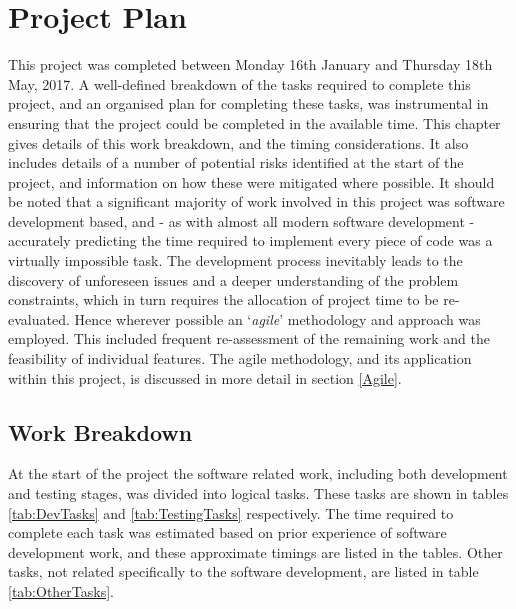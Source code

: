 
\chapter[Project Plan]{Project Plan} %

\label{ChapterPlan} %


This project was completed between Monday 16th January and Thursday 18th May, 2017. A well-defined breakdown of the tasks required to complete this project, and an organised plan for completing these tasks, was instrumental in ensuring that the project could be completed in the available time. This chapter gives details of this work breakdown, and the timing considerations. It also includes details of a number of potential risks identified at the start of the project, and information on how these were mitigated where possible. It should be noted that a significant majority of work involved in this project was software development based, and - as with almost all modern software development - accurately predicting the time required to implement every piece of code was a virtually impossible task. The development process inevitably leads to the discovery of unforeseen issues and a deeper understanding of the problem constraints, which in turn requires the allocation of project time to be re-evaluated. Hence wherever possible an `\textit{agile}' methodology and approach was employed. This included frequent re-assessment of the remaining work and the feasibility of individual features. The agile methodology, and its application within this project, is discussed in more detail in section \ref{Agile}.


\section{Work Breakdown}
At the start of the project the software related work, including both development and testing stages, was divided into logical tasks. These tasks are shown in tables \ref{tab:DevTasks} and \ref{tab:TestingTasks} respectively. The time required to complete each task was estimated based on prior experience of software development work, and these approximate timings are listed in the tables. Other tasks, not related specifically to the software development, are listed in table \ref{tab:OtherTasks}.

